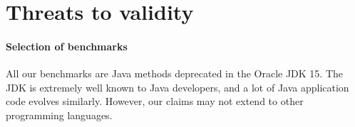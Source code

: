 \documentclass[sigconf,review,anonymous]{acmart}
\begin{document}






\section{Threats to validity}

\paragraph{Selection of benchmarks}
%
All our benchmarks are Java methods deprecated in the Oracle JDK 15.
The JDK is extremely well known to Java developers, and a lot
of Java application code evolves similarly.
%
However, our claims may not extend to other programming languages.

\end{document}
